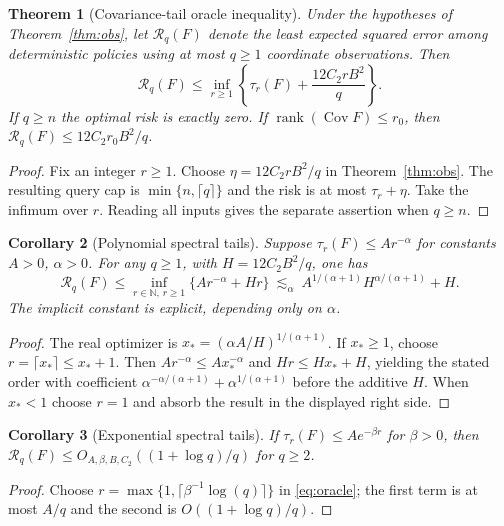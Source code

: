 \documentclass[11pt,letterpaper]{article}
\newtheorem{theorem}{Theorem}[section]
\newtheorem{corollary}[theorem]{Corollary}
\theoremstyle{definition}
\begin{document}
\begin{theorem}[Covariance-tail oracle inequality]\label{thm:spectral}
Under the hypotheses of Theorem~\ref{thm:obs}, let $\mathcal R_q(F)$
denote the least expected squared error among deterministic policies using
at most $q\ge1$ coordinate observations. Then
\begin{equation}\label{eq:oracle}
\boxed{\mathcal R_q(F)\le
\inf_{r\ge1}\left\{\tau_r(F)+\frac{12C_2rB^2}{q}\right\}.}
\end{equation}
If $q\ge n$ the optimal risk is exactly zero. If $\operatorname{rank}(\operatorname{Cov}F)\le r_0$,
then $\mathcal R_q(F)\le12C_2r_0B^2/q$.
\end{theorem}
\begin{proof}
Fix an integer $r\ge1$. Choose $\eta=12C_2rB^2/q$ in
Theorem~\ref{thm:obs}. The resulting query cap is
$\min\{n,\lceil q\rceil\}$ and the risk is at most
$\tau_r+\eta$. Take the infimum over $r$. Reading all inputs gives the
separate assertion when $q\ge n$.
\end{proof}
\begin{corollary}[Polynomial spectral tails]\label{cor:power}
Suppose $\tau_r(F)\le Ar^{-\alpha}$ for constants $A>0$, $\alpha>0$.
For any $q\ge1$, with $H=12C_2B^2/q$, one has
\begin{equation}\label{eq:powerrate}
\mathcal R_q(F)\le \inf_{r\in\mathbb N,\,r\ge1}\{Ar^{-\alpha}+Hr\}
\ \lesssim_\alpha\ A^{1/(\alpha+1)}H^{\alpha/(\alpha+1)}+H.
\end{equation}
The implicit constant is explicit, depending only on $\alpha$.
\end{corollary}
\begin{proof}
The real optimizer is $x_*=(\alpha A/H)^{1/(\alpha+1)}$.
If $x_*\ge1$, choose $r=\lceil x_*\rceil\le x_*+1$.
Then $Ar^{-\alpha}\le A x_*^{-\alpha}$ and
$Hr\le Hx_*+H$, yielding the stated order with coefficient
$\alpha^{-\alpha/(\alpha+1)}+\alpha^{1/(\alpha+1)}$
before the additive $H$. When $x_*<1$ choose $r=1$ and absorb the result
in the displayed right side.
\end{proof}
\begin{corollary}[Exponential spectral tails]\label{cor:exp}
If $\tau_r(F)\le A e^{-\beta r}$ for $\beta>0$, then
$\mathcal R_q(F)\le O_{A,\beta,B,C_2}((1+\log q)/q)$ for $q\ge2$.
\end{corollary}
\begin{proof}
Choose $r=\max\{1,\lceil\beta^{-1}\log(q)\rceil\}$ in
\eqref{eq:oracle}; the first term is at most $A/q$ and the second
is $O((1+\log q)/q)$.
\end{proof}
\end{document}
